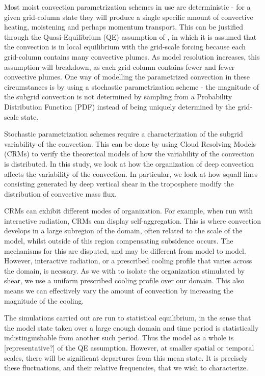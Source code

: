 \documentclass[11pt,a4paper]{article}
\begin{document}
Most moist convection parametrization schemes in use are deterministic - for a given grid-column state they will produce a single specific amount of convective heating, moistening and perhaps momentum transport. This can be justified through the Quasi-Equilibrium (QE) assumption of \cite{arakawa1974}, in which it is assumed that the convection is in local equilibrium with the grid-scale forcing because each grid-column contains many convective plumes. As model resolution increases, this assumption will breakdown, as each grid-column contains fewer and fewer convective plumes. One way of modelling the parametrized convection in these circumstances is by using a stochastic parametrization scheme - the magnitude of the subgrid convection is not determined by sampling from a Probability Distribution Function (PDF) instead of being uniquely determined by the grid-scale state.

Stochastic parametrization schemes require a characterization of the subgrid variability of the convection. This can be done by using Cloud Resolving Models (CRMs) to verify the theoretical models of how the variability of the convection is distributed. In this study, we look at how the organization of deep convection affects the variability of the convection. In particular, we look at how squall lines consisting generated by deep vertical shear in the troposphere modify the distribution of convective mass flux.

CRMs can exhibit different modes of organization. For example, when run with interactive radiation, CRMs can display self-aggregation. This is where convection develops in a large subregion of the domain, often related to the scale of the model, whilst outside of this region compensating subsidence occurs. The mechanisms for this are disputed, and may be different from model to model. However, interactive radiation, or a prescribed cooling profile that varies across the domain, is necssary. As we with to isolate the organization stimulated by shear, we use a uniform prescribed cooling profile over our domain. This also means we can effectively vary the amount of convection by increasing the magnitude of the cooling.

The simulations carried out are run to statistical equilibrium, in the sense that the model state taken over a large enough domain and time period is statistically indistinguishable from another such period. Thus the model as a whole is [representative?] of the QE assumption. However, at smaller spatial or temporal scales, there will be significant departures from this mean state. It is precisely these fluctuations, and their relative frequencies, that we wish to characterize.
\end{document}
